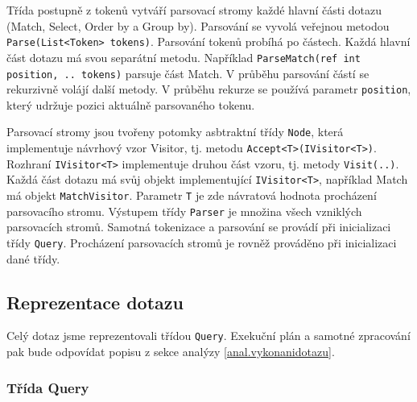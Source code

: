 Třída postupně z tokenů vytváří parsovací stromy každé hlavní části dotazu (Match, Select, Order by a Group by).
Parsování se vyvolá veřejnou metodou \texttt{Parse(List<Token> tokens)}.
Parsování tokenů probíhá po částech.
Každá hlavní část dotazu má svou separátní metodu.
Například \texttt{ParseMatch(ref int position, .. tokens)} parsuje část Match. 
V průběhu parsování částí se rekurzivně volájí další metody.
V průběhu rekurze se používá parametr \texttt{position}, který udržuje pozici aktuálně parsovaného tokenu.

Parsovací stromy jsou tvořeny potomky asbtraktní třídy \texttt{Node}, která implementuje návrhový vzor Visitor, tj. metodu \texttt{Accept<T>(IVisitor<T>)}.
Rozhraní \texttt{IVisitor<T>} implementuje druhou část vzoru, tj. metody \texttt{Visit(..)}.
Každá část dotazu má svůj objekt implementující \texttt{IVisitor<T>}, například Match má objekt \texttt{MatchVisitor}.
Parametr \texttt{T} je zde návratová hodnota procházení parsovacího stromu.
Výstupem třídy \texttt{Parser} je množina všech vzniklých parsovacích stromů.
Samotná tokenizace a parsování se provádí při inicializaci třídy \texttt{Query}.
Procházení parsovacích stromů je rovněž prováděno při inicializaci dané třídy.

\subsection{Reprezentace dotazu}
Celý dotaz jsme reprezentovali třídou \texttt{Query}.
Exekuční plán a samotné zpracování pak bude odpovídat popisu z sekce analýzy \ref{anal.vykonanidotazu}.

\subsubsection{Třída Query}


